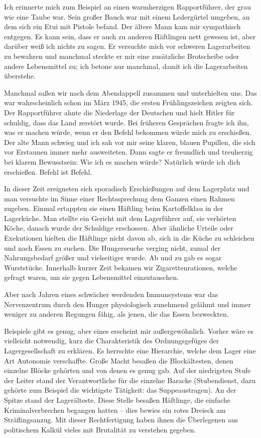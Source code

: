 \documentclass[a4paper,12pt,ngerman,
]{nisebook}
\begin{document}
Ich erinnerte mich zum Beispiel an einen warmherzigen Rapportführer, der grau wie eine Taube war.  Sein großer Bauch war mit einem Ledergürtel umgeben, an dem sich ein Etui mit Pistole befand. Der ältere Mann kam mir sympathisch entgegen. Es kann sein, dass er auch zu anderen Häftlingen nett gewesen ist, aber darüber weiß ich nichts zu sagen. Er versuchte mich vor schweren Lagerarbeiten zu bewahren und manchmal steckte er mir eine zusätzliche Brotscheibe oder andere Lebensmittel zu; ich betone nur manchmal, damit ich die Lagerarbeiten überstehe.

Manchmal saßen wir nach dem Abendappell zusammen und unterhielten uns. 
Das war wahrscheinlich schon im März 1945, die ersten Frühlingszeichen zeigten sich. Der Rapportführer ahnte die Niederlage der Deutschen und hielt Hitler für schuldig, dass das Land zerstört wurde. Bei früheren Gesprächen fragte ich ihn, was er machen würde, wenn er den Befehl bekommen würde mich zu erschießen.
Der alte Mann schwieg und ich sah vor mir seine klaren, blauen Pupillen, die sich vor Erstaunen immer mehr ausweiteten. Dann sagte er freundlich und treuherzig bei klarem Bewusstsein: \glqq Wie ich es machen würde? Natürlich würde ich dich erschießen. Befehl ist Befehl.\grqq

In dieser Zeit ereigneten sich sporadisch Erschießungen auf dem Lagerplatz und man versuchte im Sinne einer Rechtssprechung dem Ganzen einen Rahmen zugeben. Einmal ertappten sie einen Häftling beim Kartoffelklau in der Lagerküche. Man stellte ein Gericht mit dem Lagerführer auf, sie verhörten Köche, danach wurde der Schuldige erschossen. Aber ähnliche Urteile oder Exekutionen hielten die Häftlinge nicht davon ab, sich in die Küche zu schleichen und nach Essen zu suchen. Die Hungerseuche verging nicht, zumal der Nahrungsbedarf größer und vielseitiger wurde. Ab und zu gab es sogar Wurststücke. Innerhalb kurzer Zeit bekamen wir Zigarettenrationen, welche gefragt waren, um sie gegen Lebensmittel einzutauschen.

Aber nach Jahren eines schwächer werdenden Immunsystems war das Nervenzentrum durch den Hunger physiologisch zunehmend gelähmt und immer weniger zu anderen Regungen fähig, als jenen, die das Essen bezweckten.
 
Beispiele gibt es genug, aber eines erscheint mir außergewöhnlich. Vorher wäre es vielleicht notwendig, kurz die Charakteristik des Ordnungsgefüges der Lagergesellschaft zu erklären. Es herrschte eine Hierarchie, welche dem Lager eine Art Autonomie verschaffte. Große Macht besaßen die Blockältesten, denen einzelne Blöcke gehörten und von denen es genug gab. Auf der niedrigsten Stufe der Leiter stand der Verantwortliche für die einzelne Baracke (Stubendienst, dazu gehörte zum Beispiel die wichtigste Tätigkeit: das Suppeaustragen). An der Spitze stand der Lagerälteste. Diese Stelle besaßen Häftlinge, die einfache Kriminalverbrechen begangen hatten -- dies bewies ein rotes Dreieck am Sträflingsanzug. Mit dieser Rechtfertigung haben ihnen die Überlegenen aus politischem Kalkül vieles mit Brutalität zu verstehen gegeben.
\end{document}
